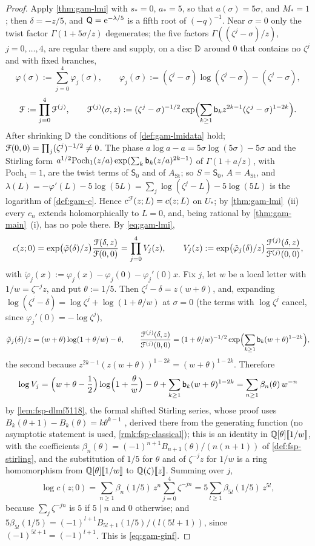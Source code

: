 \begin{proof}
Apply \cref{thm:gam-lmi} with $s_*=0$, $a_*=5$, so that $a(\sigma)=5\sigma$, and $M_*=1$; then $\delta=-z/5$, and $\mathsf Q=\mathrm{e}^{-\lambda/5}$ is a fifth root of $(-q)^{-1}$. Near $\sigma=0$ only the twist factor $\Gamma(1+5\sigma/z)$ degenerates; the five factors $\Gamma((\zeta^j-\sigma)/z)$, $j=0,\dots,4$, are regular there and supply, on a disc $\mathbb{D}$ around $0$ that contains no $\zeta^j$ and with fixed branches,
\[
\varphi(\sigma):=\sum_{j=0}^4\varphi_j(\sigma),\qquad \varphi_j(\sigma):=(\zeta^j-\sigma)\log(\zeta^j-\sigma)-(\zeta^j-\sigma),
\]
\[
\mathcal{F}:=\prod_{j=0}^4\mathcal{F}^{(j)},\qquad \mathcal{F}^{(j)}(\sigma,z):=(\zeta^j-\sigma)^{-1/2}\exp\Bigl(\sum_{k\geq 1}\mathsf{b}_kz^{2k-1}(\zeta^j-\sigma)^{1-2k}\Bigr).
\]
After shrinking $\mathbb{D}$ the conditions of \cref{def:gam-lmidata} hold; $\mathcal{F}(0,0)=\prod_j(\zeta^j)^{-1/2}\neq 0$. The phase $a\log a-a=5\sigma\log(5\sigma)-5\sigma$ and the Stirling form $a^{1/2}\mathrm{Poch}_1(z/a)\exp(\sum_k\mathsf{b}_k(z/a)^{2k-1})$ of $\Gamma(1+a/z)$, with $\mathrm{Poch}_1=1$, are the twist terms of $\mathsf S_0$ and of $A_{\mathrm{St}}$; so $S=\mathsf S_0$, $A=A_{\mathrm{St}}$, and $\lambda(L)=-\varphi'(L)-5\log(5L)=\sum_j\log(\zeta^j-L)-5\log(5L)$ is the logarithm of \cref{def:gam-c}. Hence $c^{\mathcal{F}}(z;L)=c(z;L)$ on $U_*$; by \cref{thm:gam-lmi}~(ii) every $c_n$ extends holomorphically to $L=0$, and, being rational by \cref{thm:gam-main}~(i), has no pole there. By \eqref{eq:gam-lmi},
\[
c(z;0)=\exp\bigl(\tilde\varphi(\delta)/z\bigr)\frac{\mathcal{F}(\delta,z)}{\mathcal{F}(0,0)}=\prod_{j=0}^4V_j(z),\qquad V_j(z):=\exp\bigl(\tilde\varphi_j(\delta)/z\bigr)\frac{\mathcal{F}^{(j)}(\delta,z)}{\mathcal{F}^{(j)}(0,0)},
\]
with $\tilde\varphi_j(x):=\varphi_j(x)-\varphi_j(0)-\varphi_j'(0)x$. Fix $j$, let $w$ be a local letter with $1/w=\zeta^{-j}z$, and put $\theta:=1/5$. Then $\zeta^j-\delta=z(w+\theta)$, and, expanding $\log(\zeta^j-\delta)=\log\zeta^j+\log(1+\theta/w)$ at $\sigma=0$ (the terms with $\log\zeta^j$ cancel, since $\varphi_j'(0)=-\log\zeta^j$),
\[
\tilde\varphi_j(\delta)/z=(w+\theta)\log(1+\theta/w)-\theta,\qquad \frac{\mathcal{F}^{(j)}(\delta,z)}{\mathcal{F}^{(j)}(0,0)}=(1+\theta/w)^{-1/2}\exp\Bigl(\sum_{k\geq 1}\mathsf{b}_k(w+\theta)^{1-2k}\Bigr),
\]
the second because $z^{2k-1}(z(w+\theta))^{1-2k}=(w+\theta)^{1-2k}$. Therefore
\[
\log V_j=\Bigl(w+\theta-\frac12\Bigr)\log\Bigl(1+\frac{\theta}{w}\Bigr)-\theta+\sum_{k\geq 1}\mathsf{b}_k(w+\theta)^{1-2k}=\sum_{n\geq 1}\beta_n(\theta)\,w^{-n}
\]
by \cref{lem:fsp-dlmf5118}, the formal shifted Stirling series, whose proof uses $B_k(\theta+1)-B_k(\theta)=k\theta^{k-1}$ \cite[24.4.1]{DLMF}, derived there from the generating function (no asymptotic statement is used, \cref{rmk:fsp-classical}); this is an identity in $\mathbb{Q}[\theta][\![ 1/w ]\!]$, with the coefficients $\beta_n(\theta)=(-1)^{n+1}B_{n+1}(\theta)/(n(n+1))$ of \cref{def:fsp-stirling}, and the substitution of $1/5$ for $\theta$ and of $\zeta^{-j}z$ for $1/w$ is a ring homomorphism from $\mathbb{Q}[\theta][\![ 1/w ]\!]$ to $\mathbb{Q}(\zeta)[\![ z ]\!]$. Summing over $j$,
\[
\log c(z;0)=\sum_{n\geq 1}\beta_n(1/5)\,z^n\sum_{j=0}^4\zeta^{-jn}=5\sum_{l\geq 1}\beta_{5l}(1/5)\,z^{5l},
\]
because $\sum_j\zeta^{-jn}$ is $5$ if $5\mid n$ and $0$ otherwise; and $5\beta_{5l}(1/5)=(-1)^{l+1}B_{5l+1}(1/5)/(l(5l+1))$, since $(-1)^{5l+1}=(-1)^{l+1}$. This is \eqref{eq:gam-ginf}.
\end{proof}


